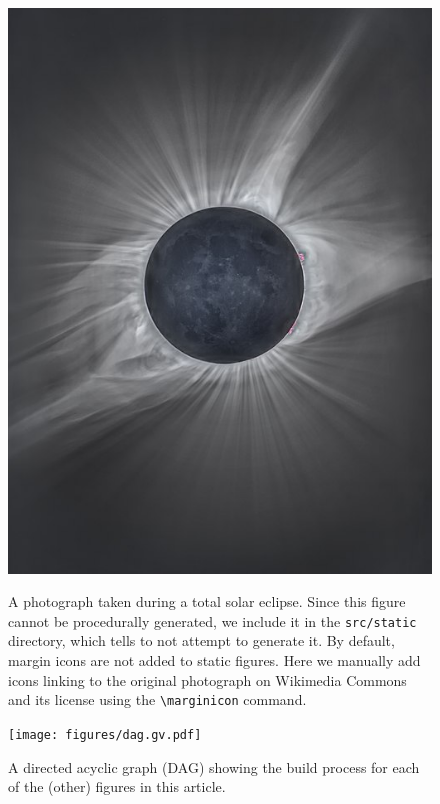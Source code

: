 \documentclass[twocolumn]{aastex631}
\begin{document}
\begin{figure}[ht!]
    \begin{centering}
        \includegraphics[width=0.75\linewidth]{static/eclipse.jpeg}
        \caption{
            A photograph taken during a total solar eclipse. 
            Since this figure cannot be procedurally generated, we include it in the \texttt{src/static} directory, which tells \showyourwork to not attempt to generate it. 
            By default, margin icons are not added to static figures.
            Here we manually add icons linking to the original photograph on Wikimedia Commons and its license using the \texttt{\textbackslash marginicon} command.
        }
        \label{fig:eclipse}
    \end{centering}
\end{figure}

\begin{figure}[ht!]
    \begin{centering}
        \texttt{[image: figures/dag.gv.pdf]}
        \caption{
            A directed acyclic graph (DAG) showing the build process for each of the (other) figures in this article. 
        }
        \label{fig*:dag}
    \end{centering}
\end{figure}


\end{document}
